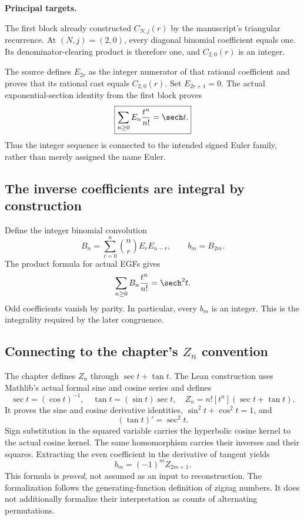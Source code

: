 \textbf{Principal targets.}\par
{}\par
{}\par
{}
\par\medskip
{}
The first block already constructed $C_{N,j}(r)$ by the manuscript's triangular recurrence. At $(N,j)=(2,0)$, every diagonal binomial coefficient equals one. Its denominator-clearing product is therefore one, and $C_{2,0}(r)$ is an integer.

The source defines $E_{2r}$ as the integer numerator of that rational coefficient and proves that its rational cast equals $C_{2,0}(r)$. Set $E_{2r+1}=0$. The actual exponential-section identity from the first block proves
\[
 \boxed{\sum_{n\ge0}E_n\frac{t^n}{n!}=\sech t.}
\]
Thus the integer sequence is connected to the intended signed Euler family, rather than merely assigned the name Euler.

\subsection*{The inverse coefficients are integral by construction}
Define the integer binomial convolution
\[
 B_n=\sum_{r=0}^{n}\binom nr E_rE_{n-r},\qquad b_m=B_{2m}.
\]
The product formula for actual EGFs gives
\[
 \sum_{n\ge0}B_n\frac{t^n}{n!}=\sech^2 t.
\]
Odd coefficients vanish by parity. In particular, every $b_m$ is an integer. This is the integrality required by the later congruence.

\subsection*{Connecting to the chapter's $Z_n$ convention}
The chapter defines $Z_n$ through $\sec t+\tan t$. The Lean construction uses Mathlib's actual formal sine and cosine series and defines
\[
 \sec t=(\cos t)^{-1},\quad \tan t=(\sin t)\sec t,
 \quad Z_n=n![t^n](\sec t+\tan t).
\]
It proves the sine and cosine derivative identities, $\sin^2t+\cos^2t=1$, and
\[
 (\tan t)'=\sec^2t.
\]
Sign substitution in the squared variable carries the hyperbolic cosine kernel to the actual cosine kernel. The same homomorphism carries their inverses and their squares. Extracting the even coefficient in the derivative of tangent yields
\[
 \boxed{b_m=(-1)^m Z_{2m+1}.}
\]
This formula is \emph{proved}, not assumed as an input to reconstruction. The formalization follows the generating-function definition of zigzag numbers. It does not additionally formalize their interpretation as counts of alternating permutations.

